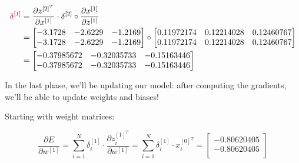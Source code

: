 \documentclass[12pt]{article}
\begin{document}
\begin{enumerate}[leftmargin=\labelsep]
          \begin{equation*}
            \begin{aligned}
              \textcolor{purple}{\delta^{[1]}} & = \frac{\partial z^{[2]^T}}{\partial x^{[1]}} \cdot \delta^{[2]} \circ \frac{\partial x^{[1]}}{\partial z^{[1]}} \\
                                               & = \begin{bmatrix}
                                                -3.1728 & -2.6229 & -1.2169\\
                                                -3.1728 & -2.6229 & -1.2169\\
                                              \end{bmatrix} \circ \begin{bmatrix}
                                                0.11972174 & 0.12214028 & 0.12460767\\
                                                0.11972174 & 0.12214028 & 0.12460767\\
                                              \end{bmatrix}                                                                            \\
                                               & = \begin{bmatrix}
                                                -0.37985672 & -0.32035733 & -0.15163446\\
                                                -0.37985672 & -0.32035733 & -0.15163446\\
                                              \end{bmatrix}
            \end{aligned}
          \end{equation*}

        In the last phase, we'll be updating our model: after computing the gradients,
        we'll be able to update weights and biases!

        Starting with weight matrices:

        \begin{equation*}
          \frac{\partial E}{\partial w^{[1]}} = \sum_{i=1}^N \delta_i^{[1]} \cdot
          \frac{\partial z_i^{[1]^T}}{\partial w^{[1]}}
          = \sum_{i=1}^N \delta_i^{[1]} \cdot x_i^{[0]^T}
          = \begin{bmatrix}
            -0.80620405\\
            -0.80620405\\
          \end{bmatrix}
        \end{equation*}


\end{enumerate}
\end{document}

